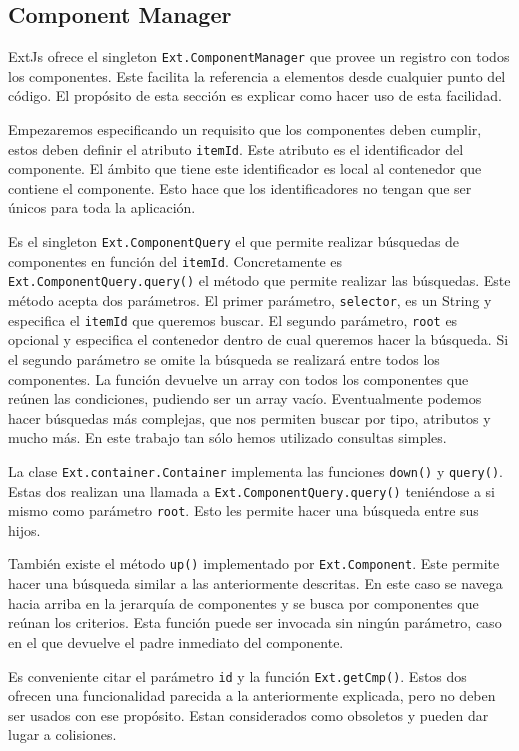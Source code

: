 	\subsection{Component Manager}
		ExtJs ofrece el singleton \texttt{Ext.ComponentManager} que provee un registro con todos los componentes. Este facilita la referencia
		a elementos desde cualquier punto del código. El propósito de esta sección es explicar como hacer uso de esta facilidad.
		\par
		Empezaremos especificando un requisito que  los componentes deben cumplir, estos deben definir el atributo \texttt{itemId}. Este
		atributo es el identificador del componente. El ámbito que tiene este identificador es local al contenedor que contiene el componente.
		Esto hace que los identificadores no tengan que ser únicos para toda la aplicación. 
		\par
		Es el singleton \texttt{Ext.ComponentQuery} el que permite realizar búsquedas de componentes en función del \texttt{itemId}.
		Concretamente es \texttt{Ext.ComponentQuery.query()} el método que permite realizar las búsquedas. Este método acepta dos parámetros.
		El primer parámetro, \texttt{selector}, es un String y especifica el \texttt{itemId} que queremos buscar. El segundo parámetro,
		\texttt{root} es opcional y especifica el contenedor dentro de cual queremos hacer la búsqueda. Si el segundo parámetro se omite la
		búsqueda se realizará entre todos los componentes. La función devuelve un array con todos los componentes que reúnen las condiciones,
		pudiendo ser un array vacío. Eventualmente podemos hacer búsquedas más complejas, que nos permiten buscar por tipo, atributos y mucho
		más. En este trabajo tan sólo hemos utilizado consultas simples.
		\par
		La clase \texttt{Ext.container.Container} implementa las funciones \texttt{down()} y \texttt{query()}. Estas dos realizan una llamada
		a \texttt{Ext.ComponentQuery.query()} teniéndose a si mismo como parámetro \texttt{root}. Esto les permite hacer una búsqueda entre
		sus hijos.
		\par
		También existe el método \texttt{up()} implementado por \texttt{Ext.Component}. Este permite hacer una búsqueda similar a las
		anteriormente descritas. En este caso se navega hacia arriba en la jerarquía de componentes y se busca por componentes que reúnan los
		criterios. Esta función puede ser invocada sin ningún parámetro, caso en el que devuelve el padre inmediato del componente.
		\par
		Es conveniente citar el parámetro \texttt{id} y la función \texttt{Ext.getCmp()}. Estos dos ofrecen una funcionalidad parecida a la
		anteriormente explicada, pero no deben ser usados con ese propósito. Estan considerados como obsoletos y pueden dar lugar a
		colisiones. 
